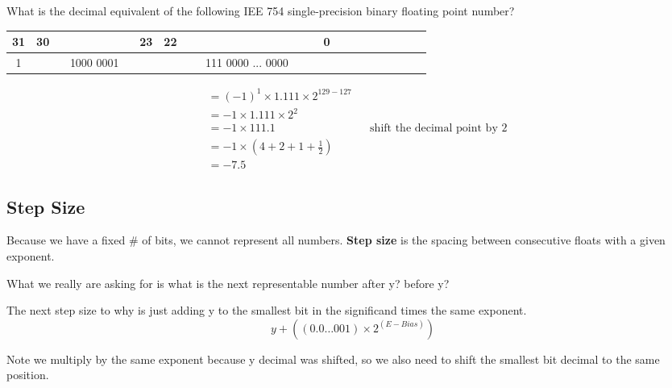\documentclass[12pt]{article}
\begin{document}
\begin{example}
    What is the decimal equivalent of the following IEE 754 single-precision binary floating point number?
    \begin{center}
        \begin{tabular}{|*{32}{c}}
            \hline
            31                      & 30                             &                                         &  &  &  &  &  &  & 23 & 22 &  &  &  &  &  &  &  &  &  &  &  &  & \multicolumn{1}{c|}{0} \\ \hline

            \multicolumn{1}{|c|}{1} & \multicolumn{9}{c|}{1000 0001} & \multicolumn{14}{c|}{111 0000 ... 0000}                                                                                          \\ \hline
        \end{tabular}
    \end{center}

    \begin{align}
         & = (-1)^1 \times 1.111 \times 2^{129 - 127}                                          \\
         & = -1 \times 1.111 \times 2^{2}                                                      \\
         & = -1 \times 111.1                          &  & \text{shift the decimal point by 2} \\
         & = -1 \times (4 + 2 + 1 + \frac{1}{2})                                               \\
         & =  -7.5
    \end{align}
\end{example}

\subsection*{Step Size}
Because we have a fixed \# of bits, we cannot represent all numbers. \textbf{Step size} is the spacing between consecutive floats with a given exponent.

What we really are asking for is what is the next representable number after y? before y?

The next step size to why is just adding y to the smallest bit in the significand times the same exponent.
$$
    y + ((0.0\dots001) \times 2^{(E - Bias)})
$$

Note we multiply by the same exponent because y decimal was shifted, so we also need to shift the smallest bit decimal to the same position.
\end{document}
